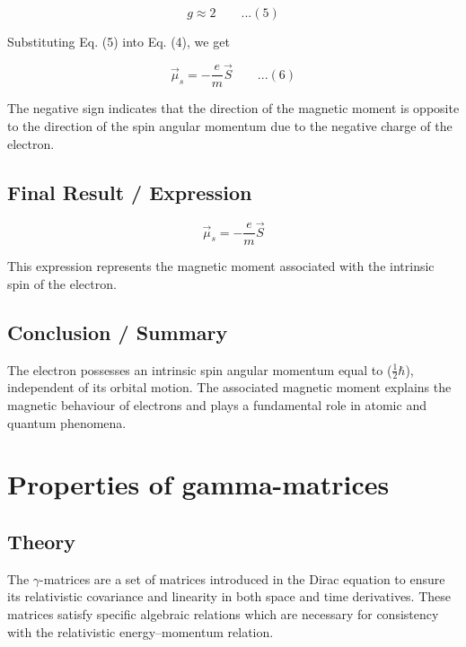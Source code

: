 \documentclass[12pt]{report}
\begin{document}
\begin{equation*}
g \approx 2 \qquad ...(5)
\end{equation*}

Substituting Eq. (5) into Eq. (4), we get

\begin{equation*}
\vec{\mu}_s = - \frac{e}{m} \vec{S}\qquad ...(6)
\end{equation*}

The negative sign indicates that the direction of the magnetic moment is opposite to the direction of the spin angular momentum due to the negative charge of the electron.

\subsection*{Final Result / Expression}

\begin{equation*}
\boxed{\vec{\mu}_s = - \frac{e}{m} \vec{S}}
\end{equation*}

This expression represents the magnetic moment associated with the intrinsic spin of the electron.

\subsection*{Conclusion / Summary}

The electron possesses an intrinsic spin angular momentum equal to ($\frac{1}{2}\hbar$), independent of its orbital motion. The associated magnetic moment explains the magnetic behaviour of electrons and plays a fundamental role in atomic and quantum phenomena.

\section{Properties of gamma-matrices}



\subsection*{Theory}

The $\gamma$-matrices are a set of matrices introduced in the Dirac equation to ensure its relativistic covariance and linearity in both space and time derivatives. These matrices satisfy specific algebraic relations which are necessary for consistency with the relativistic energy--momentum relation.
\end{document}
